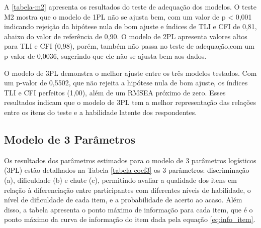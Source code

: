 A \ref{tabela-m2} apresenta os resultados do teste de adequação dos modelos. O teste M2 mostra que o modelo de 1PL não se ajusta bem, com um valor de p < 0,001 indicando rejeição da hipótese nula de bom ajuste e índices de TLI e CFI de 0,81, abaixo do valor de referência de 0,90. O modelo de 2PL apresenta valores altos para TLI e CFI (0,98), porém, também não passa no teste de adequação,com um p-valor de 0,0036, sugerindo que ele não se ajusta bem aos dados.

O modelo de 3PL demonstra o melhor ajuste entre os três modelos testados. Com um p-valor de 0,5502, que não rejeita a hipótese nula de bom ajuste, os índices TLI e CFI perfeitos (1,00), além de um RMSEA próximo de zero. Esses resultados indicam que o modelo de 3PL tem a melhor representação das relações entre os itens do teste e a habilidade latente dos respondentes.


\subsection{Modelo de 3 Parâmetros}

Os resultados dos parâmetros estimados para o modelo de 3 parâmetros logísticos (3PL) estão detalhados na Tabela \ref{tabela-coef3} os 3 parâmetros: discriminação (a), dificuldade (b) e chute (c), permitindo avaliar a qualidade dos itens em relação à diferenciação entre participantes com diferentes níveis de habilidade, o nível de dificuldade de cada item, e a probabilidade de acerto ao acaso. Além disso, a tabela apresenta o ponto máximo de informação para cada item, que é o ponto máximo da curva de informação do item  dada pela equação \ref{eq:info_item}.

